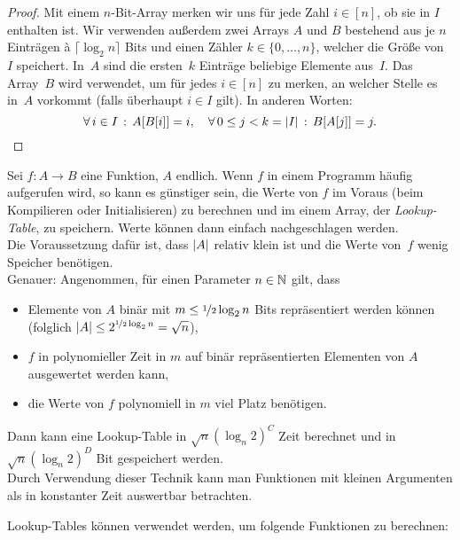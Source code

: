 \documentclass{cheat-sheet}
\newcommand{\ceil}[1]{\lceil #1 \rceil} %
\begin{document}
\begin{proof}
  Mit einem $n$-Bit-Array merken wir uns für jede Zahl $i \in [n]$, ob sie in $I$ enthalten ist.
  Wir verwenden außerdem zwei Arrays $A$ und $B$ bestehend aus je $n$ Einträgen à $\ceil{\log_2 n}$ Bits und einen Zähler $k \in \{ 0, \ldots, n \}$, welcher die Größe von~$I$ speichert.
  In~$A$ sind die ersten~$k$ Einträge beliebige Elemente aus~$I$.
  Das Array~$B$ wird verwendet, um für jedes $i \in [n]$ zu merken, an welcher Stelle es in~$A$ vorkommt (falls überhaupt $i \in I$ gilt).
  In anderen Worten:
  \[
    \forall \, {i \in I} \,:\, A[B[i]] = i, \quad
    \forall \, {0 \leq j < k = \lvert I\rvert} \,:\, B[A[j]] = j.
    \qedhere
  \]
\end{proof}

\begin{technik}
  Sei $f : A \to B$ eine Funktion, $A$ endlich.
  Wenn $f$ in einem Programm häufig aufgerufen wird, so kann es günstiger sein, die Werte von $f$ im Voraus (beim Kompilieren oder Initialisieren) zu berechnen und im einem Array, der \emph{Lookup-Table}, zu speichern.
  Werte können dann einfach nachgeschlagen werden. \\
  Die Voraussetzung dafür ist, dass $\lvert A\rvert$ relativ klein ist und die Werte von~$f$ wenig Speicher benötigen. \\
  Genauer: Angenommen, für einen Parameter $n \in \mathbb{N}$ gilt, dass
  \begin{itemize}
    \item Elemente von $A$ binär mit $m \leq \nicefrac{1}{2} \log_2 n$ Bits repräsentiert werden können (folglich $\lvert A\rvert \leq 2^{\nicefrac{1}{2} \log_2 n} = \sqrt{n}$),
    \item $f$ in polynomieller Zeit in $m$ auf binär repräsentierten Elementen von $A$ ausgewertet werden kann,
    \item die Werte von $f$ polynomiell in $m$ viel Platz benötigen.
  \end{itemize}
  Dann kann eine Lookup-Table in $\sqrt{n} (\log_n 2)^C$ Zeit berechnet und in $\sqrt{n} (\log_n 2)^D$ Bit gespeichert werden. \\
  Durch Verwendung dieser Technik kann man Funktionen mit kleinen Argumenten als in konstanter Zeit auswertbar betrachten.
\end{technik}

\begin{bspe}
  Lookup-Tables können verwendet werden, um folgende Funktionen zu berechnen:
  \begin{itemize}
  \end{itemize}
\end{bspe}
\end{document}
